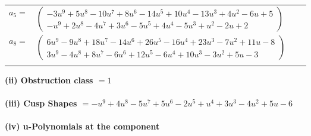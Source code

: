 \documentclass[1p]{elsarticle_modified}
\theoremstyle{definition}
\begin{document}
\begin{tabular}{m{7pt} m{180pt} m{7pt} m{180pt} }
\flushright $a_{5}=$&$\begin{pmatrix}-3 u^9+5 u^8-10 u^7+8 u^6-14 u^5+10 u^4-13 u^3+4 u^2-6 u+5\\- u^9+2 u^8-4 u^7+3 u^6-5 u^5+4 u^4-5 u^3+u^2-2 u+2\end{pmatrix}$ \\
\flushright $a_{8}=$&$\begin{pmatrix}6 u^9-9 u^8+18 u^7-14 u^6+26 u^5-16 u^4+23 u^3-7 u^2+11 u-8\\3 u^9-4 u^8+8 u^7-6 u^6+12 u^5-6 u^4+10 u^3-3 u^2+5 u-3\end{pmatrix}$\\&\end{tabular}
\flushleft \textbf{(ii) Obstruction class $= 1$}\\~\\
\flushleft \textbf{(iii) Cusp Shapes $= - u^9+4 u^8-5 u^7+5 u^6-2 u^5+u^4+3 u^3-4 u^2+5 u-6$}\\~\\
\newpage\renewcommand{\arraystretch}{1}
\flushleft \textbf{(iv) u-Polynomials at the component}\newline \\
\end{document}

